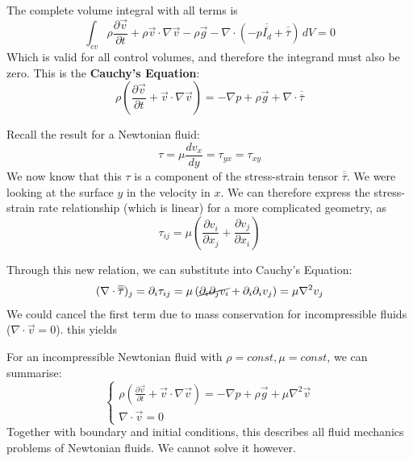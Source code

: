 The complete volume integral with all terms is
\begin{equation*}
	\int_{cv}\rho\frac{\partial \vec v}{\partial t} + \rho \vec v \cdot \nabla \vec v - \rho \vec g - \nabla \cdot (-p\overline{\overline{I_d}}+ \overline{\overline{\tau}}) \,dV = 0
\end{equation*}
Which is valid for all control volumes, and therefore the integrand must also be zero. This is the \textbf{Cauchy's Equation}:
\begin{equation}
\boxed{\rho \left(\frac{\partial \vec v}{\partial t} + \vec v \cdot \nabla \vec v \right) =-\nabla p + \rho \vec g + \nabla \cdot \overline{\overline{\tau}}}
\end{equation}



Recall the result for a Newtonian fluid:
\begin{equation*}
	\tau = \mu \frac{dv_x}{dy} = \tau_{yx}=\tau_{xy}
\end{equation*}
We now know that this $\tau$ is a component of the stress-strain tensor $\overline{\overline{\tau}}$. We were looking at the surface $y$ in the velocity in $x$. We can therefore express the stress-strain rate relationship (which is linear) for a more complicated geometry, as
\begin{equation*}
	\tau_{ij} = \mu \left(\frac{\partial v_i}{\partial x_j} + \frac{\partial v_j}{\partial x_i}\right)
\end{equation*}

Through this new relation, we can substitute into Cauchy's Equation:
\begin{equation*}
	(\nabla \cdot \overline{\overline{\tau}})_j = \partial_i\tau_{ij} = \mu \left(\cancel{\partial_i\partial_j v_i} + \partial_i \partial_i v_j\right) = \mu \nabla^2v_j
\end{equation*}
We could cancel the first term due to mass conservation for incompressible fluids ($\nabla \cdot \vec v = 0$).
this yields

	
For an incompressible Newtonian fluid with $\rho = const, \mu = const$, 
we can summarise:
\begin{equation*}
	\begin{cases}
		\rho \left(\frac{\partial \vec v}{\partial t} + \vec v \cdot \nabla \vec v \right) =-\nabla p + \rho \vec g + \mu \nabla^2\vec v\\
		\nabla \cdot \vec v = 0
	\end{cases}
\end{equation*}
Together with boundary and initial conditions, this describes all fluid mechanics problems of Newtonian fluids.
We cannot solve it however.

